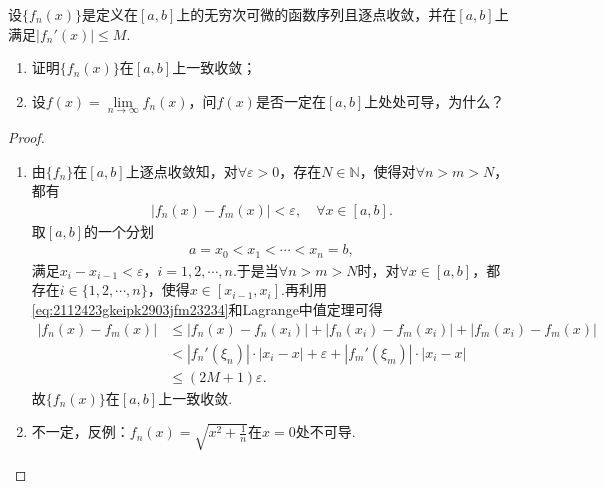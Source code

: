 \documentclass[../../main.tex]{subfiles}%
\begin{document}
\begin{example}
设$\{f_n(x)\}$是定义在$[a,b]$上的无穷次可微的函数序列且逐点收敛，并在$[a,b]$上满足$\left|f_n'(x)\right| \leqslant M$.
\begin{enumerate}[(1)]
\item 证明$\{f_n(x)\}$在$[a,b]$上一致收敛；

\item  设$f(x) = \lim\limits_{n \to \infty} f_n(x)$，问$f(x)$是否一定在$[a,b]$上处处可导，为什么？
\end{enumerate}
\end{example}
\begin{proof}
\begin{enumerate}[(1)]
\item 由$\{ f_n \}$在$[a,b]$上逐点收敛知，对$\forall \varepsilon >0$，存在$N\in \mathbb{N}$，使得对$\forall n>m>N$，都有
\begin{align}\label{eq:2112423gkeipk2903jfm23234}
| f_n(x) -f_m(x) |<\varepsilon ,\quad \forall x\in [a,b].
\end{align}
取$[a,b]$的一个分划
\begin{align*}
a=x_0<x_1<\cdots <x_n=b,
\end{align*}
满足$x_i-x_{i-1}<\varepsilon$，$i=1,2,\cdots,n.$于是当$\forall n>m>N$时，对$\forall x\in [a,b]$，都存在$i\in \{ 1,2,\cdots,n \}$，使得$x\in [x_{i-1},x_i]$.再利用\eqref{eq:2112423gkeipk2903jfm23234}和Lagrange中值定理可得
\begin{align*}
| f_n(x) -f_m(x) |&\leqslant | f_n(x) -f_n(x_i) |+| f_n(x_i) -f_m(x_i) |+| f_m(x_i) -f_m(x) | \\
&<| f_n'(\xi _n) |\cdot| x_i-x |+\varepsilon +| f_m'(\xi _m) |\cdot| x_i-x | \\
&\leqslant (2M+1)\varepsilon.
\end{align*}
故$\{ f_n(x) \}$在$[a,b]$上一致收敛.

\item 不一定，反例：$f_n(x) =\sqrt{x^2+\frac{1}{n}}$在$x=0$处不可导.
\end{enumerate}

\end{proof}
\end{document}
